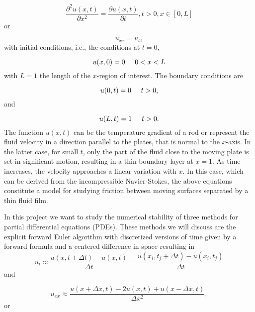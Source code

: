 \documentclass[%
oneside,                 %
final,                   %
10pt]{article}
\begin{document}
\begin{equation*}
 \frac{\partial^2 u(x,t)}{\partial x^2} =\frac{\partial u(x,t)}{\partial t}, t> 0, x\in [0,L]
\end{equation*}
or

\begin{equation*}
u_{xx} = u_t,
\end{equation*}
with initial conditions, i.e., the conditions at $t=0$,

\begin{equation*}
u(x,0)= 0 \hspace{0.5cm} 0 < x < L
\end{equation*}
with $L=1$ the length of the $x$-region of interest. The 
boundary conditions are

\begin{equation*}
u(0,t)= 0 \hspace{0.5cm} t > 0,
\end{equation*}
and

\begin{equation*}
u(L,t)= 1 \hspace{0.5cm} t > 0.
\end{equation*}
The function $u(x,t)$  can be the temperature gradient of a  rod or represent the fluid velocity 
in a direction parallel to the plates, that is normal to the $x$-axis. In the latter case, 
for small $t$, only the part of the fluid
close to the moving plate is set in significant  motion, resulting in a thin boundary layer at $x=1$. 
As time increases, the velocity approaches a linear variation with $x$. In this case, which can be derived
from the incompressible Navier-Stokes, the above equations constitute a model for  
studying friction between moving surfaces separated by a thin fluid film.

In this project we want to study the numerical stability of three methods for partial differential equations
(PDEs). 
These methods we will discuss are
the explicit forward Euler algorithm with discretized versions of time given by a forward formula and a centered difference in space resulting in   
\begin{equation*} 
u_t\approx \frac{u(x,t+\Delta t)-u(x,t)}{\Delta t}=\frac{u(x_i,t_j+\Delta t)-u(x_i,t_j)}{\Delta t}
\end{equation*}
and

\begin{equation*}
u_{xx}\approx \frac{u(x+\Delta x,t)-2u(x,t)+u(x-\Delta x,t)}{\Delta x^2},
\end{equation*}
or
\end{document}
